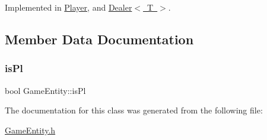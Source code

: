 Implemented in \mbox{\hyperlink{class_player_a95535954a888f7e37896d26d12ae2975}{Player}}, and \mbox{\hyperlink{class_dealer_aa59b2493c7935d90eeb046433af00fa2}{Dealer$<$ T $>$}}.



\subsection{Member Data Documentation}
\mbox{\label{class_game_entity_adebee205c33cf1563ea5d9504b070944}} 
\subsubsection{\texorpdfstring{is\+Pl}{isPl}}
{\footnotesize\ttfamily bool Game\+Entity\+::is\+Pl\hspace{0.3cm}{\ttfamily [protected]}}



The documentation for this class was generated from the following file\+:\begin{DoxyCompactItemize}
\item 
\mbox{\hyperlink{_game_entity_8h}{Game\+Entity.\+h}}\end{DoxyCompactItemize}
